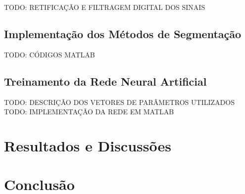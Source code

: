 \documentclass[
	12pt,				%
	openright,			%
	oneside,
	a4paper,			%
	english,			%
	francais,				%
	spanish,			%
	brazil				%
	]{abntex2}
\begin{document}
	TODO: RETIFICAÇÃO E FILTRAGEM DIGITAL DOS SINAIS

\section{Implementação dos Métodos de Segmentação}

	TODO: CÓDIGOS MATLAB

\section{Treinamento da Rede Neural Artificial}

	TODO: DESCRIÇÃO DOS VETORES DE PARÂMETROS UTILIZADOS
	TODO: IMPLEMENTAÇÃO DA REDE EM MATLAB

\chapter{Resultados e Discussões}



\chapter{Conclusão}

\postextual


\end{document}
